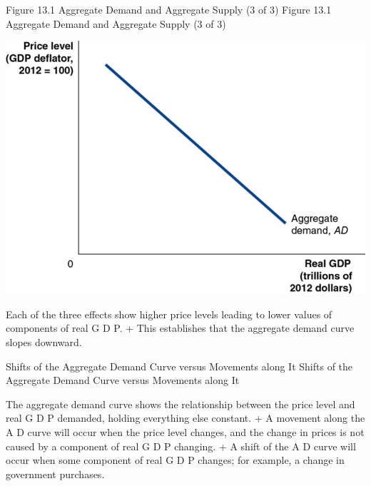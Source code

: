 \documentclass[
  12pt,
  ignorenonframetext,
]{beamer}
\begin{document}
\begin{frame}{Figure 13.1 Aggregate Demand and Aggregate Supply (3 of
3)}
\protect\hypertarget{figure-13.1-aggregate-demand-and-aggregate-supply-3-of-3}{}
Figure 13.1 Aggregate Demand and Aggregate Supply (3 of 3)

\includegraphics[width=\textwidth,height=0.99\textheight]{imgs3/img_slide11a.png}

Each of the three effects show higher price levels leading to lower
values of components of real G D P. + This establishes that the
aggregate demand curve slopes downward.
\end{frame}

\begin{frame}{Shifts of the Aggregate Demand Curve versus Movements
along It}
\protect\hypertarget{shifts-of-the-aggregate-demand-curve-versus-movements-along-it}{}
Shifts of the Aggregate Demand Curve versus Movements along It

The aggregate demand curve shows the relationship between the price
level and real G D P demanded, holding everything else constant. + A
movement along the A D curve will occur when the price level changes,
and the change in prices is not caused by a component of real G D P
changing. + A shift of the A D curve will occur when some component of
real G D P changes; for example, a change in government purchases.
\end{frame}
\end{document}
